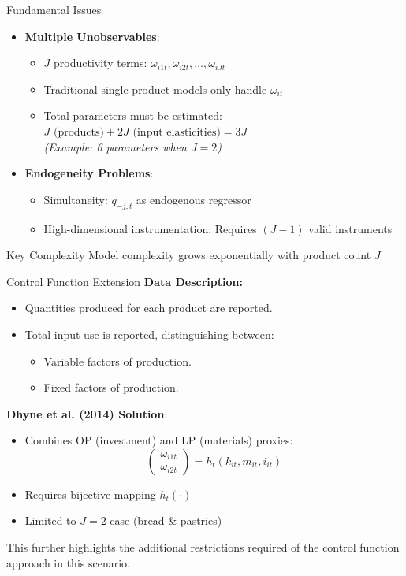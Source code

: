 \documentclass[aspectratio=169]{beamer}  %
\begin{document}
\begin{frame}{Fundamental Issues}
\begin{itemize}
    \item \textbf{Multiple Unobservables}:
    \begin{itemize}
        \item $J$ productivity terms: $\omega_{i1t}, \omega_{i2t}, \dots, \omega_{iJt}$
        \item Traditional single-product models only handle $\omega_{it}$
        \item Total parameters must be estimated: $J\text{ (products)} + 2J\text{ (input elasticities)} = 3J$ \\
              \textit{(Example: 6 parameters when $J=2$)}
    \end{itemize}
    
    \item \textbf{Endogeneity Problems}:
    \begin{itemize}
        \item Simultaneity: $q_{-j,t}$ as endogenous regressor
        \item High-dimensional instrumentation: Requires $(J-1)$ valid instruments
    \end{itemize}
\end{itemize}

\begin{alertblock}{Key Complexity}
Model complexity grows exponentially with product count $J$
\end{alertblock}
\end{frame}

\begin{frame}{Control Function Extension}
    \textbf{Data Description:}
    \begin{itemize}
        \item Quantities produced for each product are reported.
        \item Total input use is reported, distinguishing between:
        \begin{itemize}
            \item Variable factors of production.
            \item Fixed factors of production.
        \end{itemize}
    \end{itemize}

\textbf{Dhyne et al. (2014) Solution}:
\begin{itemize}
    \item Combines OP (investment) and LP (materials) proxies:
    \[
    \begin{pmatrix}
    \omega_{i1t} \\
    \omega_{i2t}
    \end{pmatrix} = h_t(k_{it}, m_{it}, i_{it})
    \]
    \item Requires bijective mapping $h_t(\cdot)$
    \item Limited to $J=2$ case (bread \& pastries)
\end{itemize}
This further highlights the additional restrictions required of the control function approach in this scenario.

\end{frame}
\end{document}
